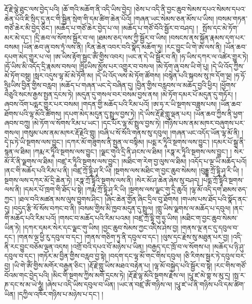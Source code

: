 རྡོ་རྗེ་ལྕེ་ཐུང་ལས་བྱེད་པའི། །ཆོ་གའི་མཆོག་ནི་འདི་ཡིས་བྱེད། །ཅེས་པ་འདི་ནི་བྱང་ཆུབ་སེམས་དཔའ་སེམས་དཔའ་ཆེན་པོའི་ཇི་སྲིད་དུ་ནང་གི་སྦྱིན་སྲེག་གི་དམ་ཚིག་ཆེན་པོའོ། །གཞན་ཡང་སེམས་ཅན་མོས་པ་ཡིས། །བསམ་གཏན་གཙོ་ཆེར་མི་བྱེད་ཅིང་། །མཆོད་པ་གཙོ་ཆེར་བྱེད་པ་ལ། །མཆོད་པ་གཙོ་བོའི་སྦྱོར་བ་བཤད། །  ​ སྤོས་དང་མེ་ཏོག་མར་མེ་དང་། །དྲི་ཆབ་ལ་སོགས་སྦྱོར་བ་ལ། །ཐམས་ཅད་ལས་ཀྱི་སྦྱོར་བ་ཡིས། །བསངས་ནས་སྐྱོན་རྣམས་དག་པར་བསམ། །ཡོན་ཆབ་ཞུ་བས་ཏྲཾ་ལས་ནི། །རིན་ཆེན་འབར་བའི་སྣོད་མཆོག་ཏུ། །རང་བྱུང་ཡི་གེ་ཨ་ལས་ནི། །ཡོན་ཆབ་དཔག་མེད་གྱུར་པ་ལ། །ཨ་ཡིས་རྟོག་སྦྱང་ཨོཾ་གྱིས་འབར། །ཡང་ན་དེ་ཡི་སྦྱོར་བ་ནི། །ཧ་ཡིས་དཀར་ལ་འཚེར་གྱུར་ཏེ། །ཧོ་ཡིས་མི་འདོད་དྲི་རྣམས་བསལ། །ཧྲཱིཿཡིས་མྱོས་པར་འགྱུར་བ་བསལ། །མེ་ཏོག་ཞུ་བས་ཡི་གེ་པུ། །དེ་ཡི་འོད་ཀྱིས་མེ་ཏོག་བསྡུ། །སླར་འདུས་ལྷ་མོ་མེ་ཏོག་མ། །དེ་ཡི་འོད་ལས་མེ་ཏོག་ཚོགས། །བསྙེན་པའི་སྐབས་སུ་ཁ་དོག་ལྔ། །ཧ་ཧོ་ཧྲཱིཿཡིས་བྱིན་གྱིས་བརླབ། །མཆོད་པ་གཞན་ཡང་དེ་བཞིན་དུ། །བྱིན་གྱིས་བརླབས་ལ་མཆོད་བྱའི་ཕྱིར། །ཕྱོགས་བཅུའི་སངས་རྒྱས་སྤྱན་དྲངས་ཏེ། །མདུན་དུ་གསལ་བར་བསམ་བྱས་ནས། །མེ་ཏོག་དམར་པོ་མདུན་དུ་གཏོར། །ཞབས་འོག་པདྨར་གྱུར་པར་བསམ། །གདན་གྱི་མཆོད་པའི་རིམ་པའོ། །ཨ་ཧ་ར་ཡི་སྔགས་བཟླས་པས། །ཡོན་ཆབ་ཐོགས་པའི་ལྷ་མོའི་ཚོགས། །དཔག་མེད་མདུན་དུ་སྤྲུལ་བྱས་ཏེ། །དེ་ཡིས་རྡོ་རྗེ་གླུ་ལྡན་པར། །ཡོན་ཆབ་ཀྱིས་ནི་ཕྱག་ཞབས་བཀྲུ། །མེ་ཏོག་ལ་སོགས་རིམ་པ་ཡང་། །དང་པོར་ལྷ་མོ་སྤྲུལ་བྱས་ཏེ། །གཉིས་པས་ནམ་མཁར་བཞུགས་པར་གསལ། །གསུམ་པས་ནམ་མཁར་རྡོ་རྗེའི་གླུ། །བཞི་པ་སོ་སོའི་གནས་སུ་དབུལ། །གཞན་ཡང་འདོད་ཡོན་ལྷ་མོ་ནི། །དྭེ་ཥ་ཏེ་ཡི་སྔགས་ལས་བྱུང་། །དཀར་མོ་གཟུགས་ནི་སྤྱན་ལ་བསྟིམ། །པདྨ་ར་ཏཱིའི་སྔགས་ལས་བྱུང་། །དམར་པོ་སྒྲ་ནི་སྙན་ལ་ཐིམ། །ཀརྨ་ར་ཏཱིའི་སྔགས་ལས་བྱུང་། །ལྗང་གུའི་དྲི་ནི་ཤངས་ལ་ཐིམ། །རཏྣ་ར་ཏཱིའི་སྔགས་ལས་བྱུང་། །
སེར་མོ་རོ་ནི་ལྗགས་ལ་ཐིམ། །བཛྲ་ར་ཏཱིའི་སྔགས་ལས་བྱུང་། །མཐིང་ག་རེག་བྱ་ལུས་ལ་ཐིམ། །འདོད་པ་ལྔ་ཡི་མཆོད་པའོ། །ནང་གི་མཆོད་པའི་རིམ་པ་ནི། །བཛྲ་ཀྲོ་དྷཱི་ཤྭ་རི་ཡི། །སྔགས་ལས་མཐིང་ག་བྱང་ཆུབ་སེམས། །བུདྡྷ་ཀྲོ་དྷཱི་ཤྭ་རི་ཡི། །སྔགས་ལས་དཀར་མོ་​དྲི་ཆེན་ཏེ། །རཏྣ་ཀྲོ་དྷཱིའི་སྔགས་ལས་ནི། །སེར་མོ་ཤ་ཆེན་ཞེས་སུ་བཤད། །པདྨ་ཀྲོ་དྷཱིའི་སྔགས་ལས་ནི། །དམར་པོ་ཁྲག་གི་ཐོད་པ་སྟེ། །ཀརྨ་ཀྲོ་དྷཱི་ཤྭ་རི་ཡི། །སྔགས་ལས་ལྗང་གུ་དྲི་ཆུའོ། །ལྷ་མོ་འདི་དག་ཐམས་ཅད་ཀྱང་། །ཐལ་བའི་མཚན་མས་ལུས་བྱུགས་ཤིང་། །ཞིང་ཆེན་གྱོན་ཞིང་དྲིལ་བུ་ཐོགས། །གཡས་པས་ཐོད་པའི་སྣོད་ནང་དུ། །བདུད་རྩི་སོ་སོས་བཀང་བ་ནི། །བསམ་གྱིས་མི་ཁྱབ་མདུན་དུ་སྤྲུལ། །གླུ་ཡིས་ལྗགས་ལ་མཆོད་པ་དབུལ། །ནང་གི་མཆོད་པའི་རིམ་པའོ། །གསང་བ་མཆོད་པའི་རིམ་པའམ། །བཛྲ་ཀྲོ་དྷཱི་གུ་ཧྱ་ཡིས། །མཐིང་ག་བྱང་ཆུབ་སེམས་ཡིན་ཏེ། །དཀར་དམར་སེར་དང་ལྗང་གུ་ཡིས། །བྱང་ཆུབ་སེམས་ཀྱང་འདིས་ཤེས་བྱ། །གནས་ལྔ་ནང་དུ་དབུལ་བ་དང་། །གནས་ལྔ་ཕྱི་རུ་དབུལ་བ་དང་། །གནས་གཅིག་ཏུ་ནི་དབུལ་བ་དང་། །ལུས་དང་རྗེས་སུ་མཐུན་པར་བྱ། །འདི་ནི་རང་བྱུང་བཅོམ་ལྡན་འདས། །འགྲོ་བའི་དཔའ་བོ་མཉེས་པ་ཡིན། །བརྒྱད་དང་ཁྲོ་བ་ལ་སོགས་པ། །མཆོད་པ་ཉི་ཤུ་དབུལ་བ་དང་། །གཏོར་མ་བྱིན་གྱིས་བརླབ་བྱ་སྟེ། །བདག་དང་ལྷ་མོ་གང་གིས་དབུལ། །ཅི་རིགས་སྦྱར་ཏེ་དབུལ་བར་བྱ། །ཡི་གེ་ཨོཾ་གྱིས་མགོར་བརྒྱན་ཅིང་། །རྡོ་རྗེ་གླུ་ཡིས་མཐའ་བརྟེན་པ། །ལྷ་མོ་བསྐྱེད་པའི་སྦྱོར་བ་སྟེ། །རང་གིས་གཙོ་བོའམ་གང་བྱེད་པའི། །མིང་གི་སྔགས་ཀྱིས་མགོ་དྲངས་ཏེ། །རྡོ་རྗེ་ལྷ་མོའི་སྔགས་རྗེས་ལ། །པཱུ་ཛ་མེ་གྷ་ས་མུ་དྲ། །སྥ་ར་ཎ་དང་ས་མ་ཡེ་ཧཱུཾ། །ཞེས་པ་འདི་ཡིས་དབུལ་བ་ཡིན། །ཡང་ན་བཛྲ་ཨོཾ་གཉིས་ལ། །པཱུ་ཛ་ཡ་ནི་གཉིས་པའི་དམ་ཚིག་ཡིན། །དཀྱིལ་འཁོར་གཉིས་པ་མཉེས་པ་དང་། །
